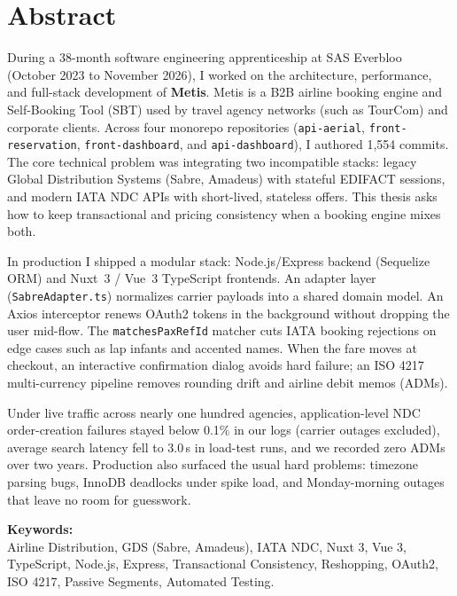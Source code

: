 \chapter*{Abstract}

\noindent During a 38-month software engineering apprenticeship at SAS Everbloo (October 2023 to November 2026), I worked on the architecture, performance, and full-stack development of \textbf{Metis}. Metis is a B2B airline booking engine and Self-Booking Tool (SBT) used by travel agency networks (such as TourCom) and corporate clients. Across four monorepo repositories (\texttt{api-aerial}, \texttt{front-reservation}, \texttt{front-dashboard}, and \texttt{api-dashboard}), I authored 1,554 commits. The core technical problem was integrating two incompatible stacks: legacy Global Distribution Systems (Sabre, Amadeus) with stateful EDIFACT sessions, and modern IATA NDC APIs with short-lived, stateless offers. This thesis asks how to keep transactional and pricing consistency when a booking engine mixes both.

\noindent In production I shipped a modular stack: Node.js/Express backend (Sequelize ORM) and Nuxt~3 / Vue~3 TypeScript frontends. An adapter layer (\texttt{SabreAdapter.ts}) normalizes carrier payloads into a shared domain model. An Axios interceptor renews OAuth2 tokens in the background without dropping the user mid-flow. The \texttt{matchesPaxRefId} matcher cuts IATA booking rejections on edge cases such as lap infants and accented names. When the fare moves at checkout, an interactive confirmation dialog avoids hard failure; an ISO 4217 multi-currency pipeline removes rounding drift and airline debit memos (ADMs).

\noindent Under live traffic across nearly one hundred agencies, application-level NDC order-creation failures stayed below 0.1\% in our logs (carrier outages excluded), average search latency fell to 3.0\,s in load-test runs, and we recorded zero ADMs over two years. Production also surfaced the usual hard problems: timezone parsing bugs, InnoDB deadlocks under spike load, and Monday-morning outages that leave no room for guesswork.

\vspace{0.6cm}
\noindent \textbf{\large Keywords:}\\
\noindent Airline Distribution, GDS (Sabre, Amadeus), IATA NDC, Nuxt 3, Vue 3, TypeScript, Node.js, Express, Transactional Consistency, Reshopping, OAuth2, ISO 4217, Passive Segments, Automated Testing.

